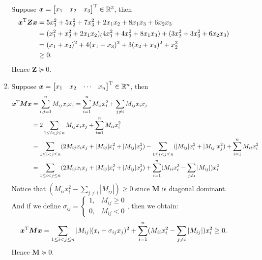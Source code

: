 \begin{enumerate}
\begin{enumerate}
Suppose $\bm x=\begin{bmatrix}
x_1&x_2&x_3
\end{bmatrix}^{\mathrm T}\in\mathbb{R}^{3}$, then 
\[
\begin{aligned}
\bm x^{\mathrm T}\bm Z\bm x&=5x_1^2+5x_2^2+7x_3^2+2x_1x_2+8x_1x_3+6x_2x_3\\
&=(x_1^2+x_2^2+2x_1x_2)_(4x_1^2+4x_3^2+8x_1x_3)+
(3x_2^2+3x_3^2+6x_2x_3)\\
&=(x_1+x_2)^2+4(x_1+x_3)^2+3(x_2+x_3)^2+x_2^2\\
&\ge0.
\end{aligned}
\]
Hence $\bm Z\succeq0.$
\item
Suppose $\bm x=\begin{bmatrix}
x_1&x_2&\cdots&x_n
\end{bmatrix}^{\mathrm T}\in\mathbb{R}^{n}$, then 
\begin{align*}
\bm x^{\mathrm T}\bm M\bm x
&=\sum_{i,j=1}^{n}M_{ij}x_ix_j=\sum_{i=1}^{n}M_{ii}x_i^2+\sum_{j\ne i}M_{ij}x_ix_j\\
&=2\sum_{1\le i<j\le n}M_{ij}x_ix_j+\sum_{i=1}^{n}M_{ii}x_i^2\\
&=\sum_{1\le i<j\le n}(2M_{ij}x_ix_j+|M_{ij}|x_i^2+|M_{ij}|x_j^2)
-\sum_{1\le i<j\le n}(|M_{ij}|x_i^2+|M_{ij}|x_j^2)
+\sum_{i=1}^{n}M_{ii}x_i^2
\\
&=\sum_{1\le i<j\le n}(2M_{ij}x_ix_j+|M_{ij}|x_i^2+|M_{ij}|x_j^2)
+\sum_{i=1}^{n}(M_{ii}x_i^2-\sum_{j\ne i}|M_{ij}|)x_i^2
\end{align*}
Notice that $(M_{ii}x_i^2-\sum_{j\ne i}|M_{ij}|)\ge0$ since $\bm M$ is diagonal dominant.
\\And if we define 
$\sigma_{ij}=\left\{
\begin{aligned}
1,&M_{ij}\ge0\\
0,&M_{ij}<0
\end{aligned}\right.$, then we obtain:
\[
\bm x^{\mathrm T}\bm M\bm x=\sum_{1\le i<j\le n}|M_{ij}|(x_i+\sigma_{ij}x_j)^2
+\sum_{i=1}^{n}(M_{ii}x_i^2-\sum_{j\ne i}|M_{ij}|)x_i^2\ge0.
\]
Hence $\bm M\succeq0.$
\end{enumerate}\end{enumerate}